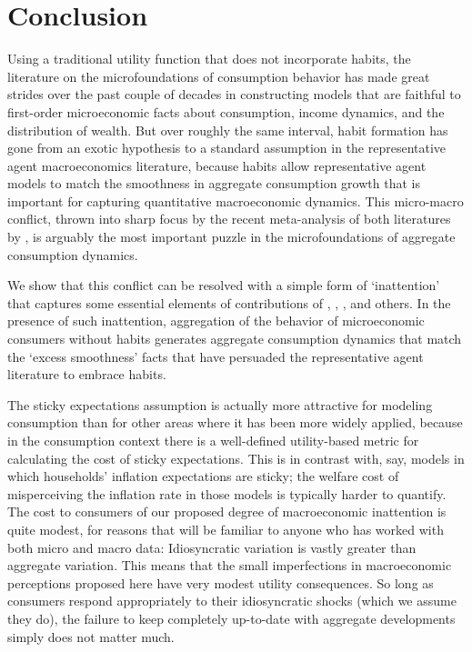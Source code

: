 \documentclass[titlepage]{article}
\begin{document}
 

\section{Conclusion} \label{sec:Conclusion}

Using a traditional utility function that does not incorporate habits, the literature on the microfoundations of consumption behavior has made great strides over the past couple of decades in constructing models that are faithful to first-order microeconomic facts about consumption, income dynamics, and the distribution of wealth.  But over roughly the same interval, habit formation has gone from an exotic hypothesis to a standard assumption in the representative agent macroeconomics literature, because habits allow representative agent models to match the smoothness in aggregate consumption growth that is important for capturing quantitative macroeconomic dynamics.  This micro-macro conflict, thrown into sharp focus by the recent meta-analysis of both literatures by \cite{hrsHabit}, is arguably the most important puzzle in the microfoundations of aggregate consumption dynamics.

We show that this conflict can be resolved with a simple form of `inattention' that captures some essential elements of contributions of \cite{simsInattention}, \cite{woodfordImperfect}, \cite{mrSlumps}, and others.  In the presence of such inattention, aggregation of the behavior of microeconomic consumers without habits generates aggregate consumption dynamics that match the `excess smoothness' facts that have persuaded the representative agent literature to embrace habits.

The sticky expectations assumption is actually more attractive for modeling consumption than for other areas where it has been more widely applied, because in the consumption context there is a well-defined utility-based metric for calculating the cost of sticky expectations.  This is in contrast with, say, models in which households' inflation expectations are sticky; the welfare cost of misperceiving the inflation rate in those models is typically harder to quantify.  The cost to consumers of our proposed degree of macroeconomic inattention is quite modest, for reasons that will be familiar to anyone who has worked with both micro and macro data: Idiosyncratic variation is vastly greater than aggregate variation.  This means that the small imperfections in macroeconomic perceptions proposed here have very modest utility consequences.  So long as consumers respond appropriately to their idiosyncratic shocks (which we assume they do), the failure to keep completely up-to-date with aggregate developments simply does not matter much.
\end{document}
